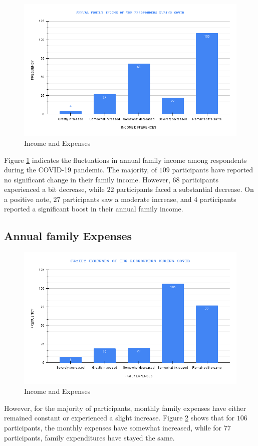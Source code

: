 \begin{figure}[h!]
	\centering
	\includegraphics[width=0.6\linewidth]{IMAGES/Image 19.png}
	\caption{Income and Expenses}
	\label{G19}
\end{figure}

 Figure \ref{G19} indicates the fluctuations in annual family income among respondents during the COVID-19 pandemic. The majority, of $109$ participants have reported no significant change in their family income. However, $68$ participants experienced a bit decrease, while $22$ participants faced a substantial decrease. On a positive note, $27$ participants saw a moderate increase, and $4$ participants reported a significant boost in their annual family income.

\subsection{Annual family Expenses}

\begin{figure}[h!]
	\centering
	\includegraphics[width=0.6\linewidth]{IMAGES/Image 20.png}
	\caption{Income and Expenses}
	\label{G20}
\end{figure}
 
However, for the majority of participants, monthly family expenses have either remained constant or experienced a slight increase. Figure \ref{G20} shows that for $106$ participants, the monthly expenses have somewhat increased, while for $77$ participants, family expenditures have stayed the same.

